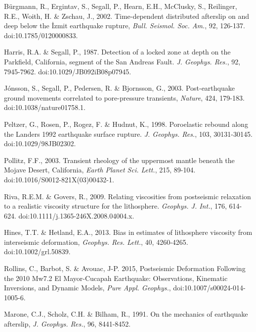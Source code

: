 \documentclass[extra]{gji}
\begin{document}
\begin{thebibliography}{}
 B\"urgmann, R.,
  Ergintav, S., Segall, P., Hearn, E.H., McClusky, S., Reilinger,
  R.E., Woith, H. \& Zschau, J., 2002. Time-dependent distributed
  afterslip on and deep below the \.Izmit earthquake rupture,
  \textit{Bull.  Seismol. Soc. Am.}, 92,
  126-137. doi:10.1785/0120000833.

 Harris, R.A. \&
  Segall, P., 1987. Detection of a locked zone at depth on the
  Parkfield, California, segment of the San Andreas
  Fault. \textit{J. Geophys. Res.}, 92,
  7945-7962. doi:10.1029/JB092iB08p07945.

 J\'onsson, S.,
  Segall, P., Pedersen, R. \& Bjornsson, G., 2003. Post-earthquake
  ground movements correlated to pore-pressure transients,
  \textit{Nature}, 424, 179-183. doi:10.1038/nature01758.1.

 Peltzer, G., Rosen, P.,
  Rogez, F. \& Hudnut, K., 1998. Poroelastic rebound along the Landers
  1992 earthquake surface rupture. \textit{J. Geophys. Res.}, 103,
  30131-30145. doi:10.1029/98JB02302.

 Pollitz, F.F., 2003. Transient
  rheology of the uppermost mantle beneath the Mojave Desert,
  California, \textit{Earth Planet Sci. Lett.}, 215,
  89-104. doi:10.1016/S0012-821X(03)00432-1.

 Riva, R.E.M. \&
  Govers, R., 2009. Relating viscosities from postseismic relaxation
  to a realistic viscosity structure for the
  lithosphere. \textit{Geophys. J.  Int.}, 176,
  614-624. doi:10.1111/j.1365-246X.2008.04004.x.

 Hines, T.T. \&
  Hetland, E.A., 2013. Bias in estimates of lithosphere viscosity from
  interseismic deformation, \textit{Geophys. Res. Lett.}, 40,
  4260-4265. doi:10.1002/grl.50839.

 Rollins, C., Barbot,
  S. \& Avouac, J-P. 2015, Postseismic Deformation Following the 2010
  Mw7.2 El Mayor-Cucapah Earthquake: Observations, Kinematic
  Inversions, and Dynamic Models, \textit{Pure Appl. Geophys.},
  doi:10.1007/s00024-014-1005-6.

 Marone, C.J., Scholz,
  C.H.  \& Bilham, R., 1991. On the mechanics of earthquake
  afterslip, \textit{J. Geophys. Res.}, 96, 8441-8452.


\end{thebibliography}
\end{document}
